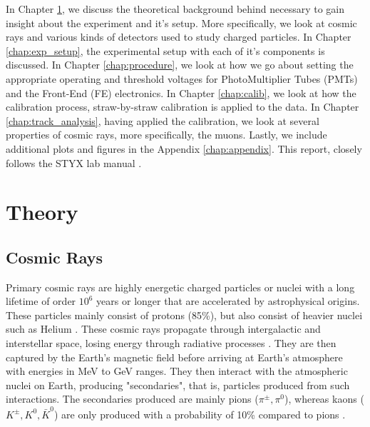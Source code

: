 \documentclass[a4paper]{report}
\numberwithin{equation}{section}
\begin{document}
In Chapter \ref{chap:theory}, we discuss the theoretical background behind necessary to gain insight about the experiment and it's setup. More specifically, we look at cosmic rays and various kinds of detectors used to study charged particles. In Chapter \ref{chap:exp_setup}, the experimental setup with each of it's components is discussed. In Chapter \ref{chap:procedure}, we look at how we go about setting the appropriate operating and threshold voltages for PhotoMultiplier Tubes (PMTs) and the Front-End (FE) electronics. In Chapter \ref{chap:calib}, we look at how the calibration process, straw-by-straw calibration is applied to the data. In Chapter \ref{chap:track_analysis}, having applied the calibration, we look at several properties of cosmic rays, more specifically, the muons. Lastly, we include additional plots and figures in the Appendix \ref{chap:appendix}. This report, closely follows the STYX lab manual \cite{labman}.

\chapter{Theory} \label{chap:theory}

\section{Cosmic Rays}



Primary cosmic rays are highly energetic charged particles or nuclei with a long lifetime of order $10^6$ years or longer that are accelerated by 
astrophysical origins. These particles mainly consist of protons (85\%), but also consist of heavier nuclei such as Helium \cite{Tanabashi2018}. 
These cosmic rays propagate through intergalactic and interstellar space, losing energy through radiative processes \cite{DeDomenico2012}.
They are then captured by the Earth's magnetic field before arriving at Earth's atmosphere with energies in MeV to GeV ranges. 
They then interact with the atmospheric nuclei on Earth, producing "secondaries", that is, particles produced from such interactions. The secondaries
produced are mainly pions ($\pi^\pm, \pi^0$), whereas kaons ($K^\pm, K^0, \bar{K}^0$) are only produced with a probability of 10\% compared to pions \cite{Grupen2005}. \par 
\end{document}
